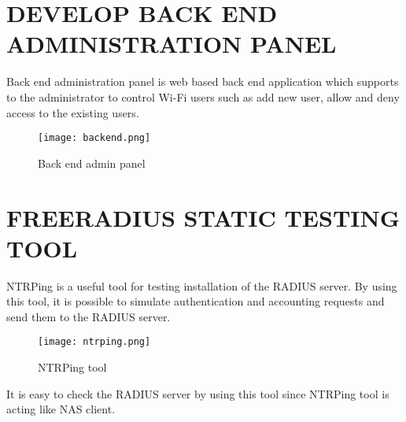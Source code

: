 \newpage
\section{DEVELOP BACK END ADMINISTRATION PANEL}
Back end administration panel is web based back end application which supports to the administrator to control Wi-Fi users such as add new user, allow and deny access to the existing users.  

\begin{center}
	\begin{figure*}[h]	
		\centering
		\texttt{[image: backend.png]}
		\caption{Back end admin panel}
	\end{figure*}
\end{center}

\newpage
\section{FREERADIUS STATIC TESTING TOOL}
NTRPing is a useful tool for testing installation of the RADIUS server. By using this tool, it is possible to simulate authentication and accounting requests and send them to the RADIUS server. 

\begin{center}
	\begin{figure*}[h]	
		\centering
		\texttt{[image: ntrping.png]}
		\caption{NTRPing tool}
	\end{figure*}
\end{center}

It is easy to check the RADIUS server by using this tool since NTRPing tool is acting like NAS client.\cite{ntrping_tool}

